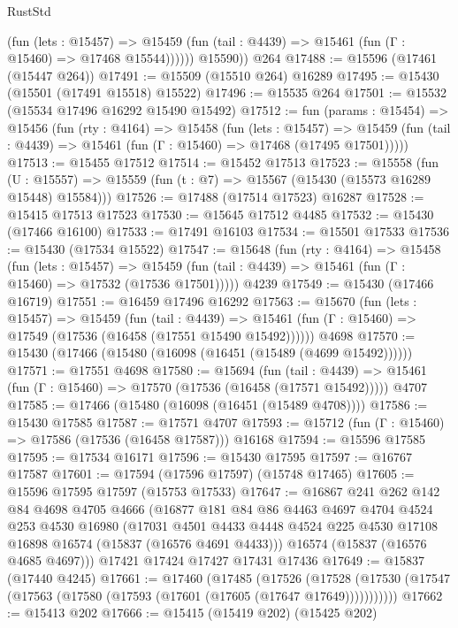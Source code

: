 \begin{lexlean}{RustStd}
\begin{coremodule}
{\begin{coremodule}
{{{{{{{{{{{{{{{{{{{{{{{{{{{{{{{{{{{{{{{{{{{{{{{{{{{{{{{{{{{{              (fun (lets : @15457) =>
              @15459 (fun (tail : @4439) => @15461 (fun (Γ : @15460) => @17468 @15544))))))
        @15590))
    @264
@17488 := @15596 (@17461 (@15447 @264))
@17491 := @15509 (@15510 @264) @16289
@17495 := @15430 (@15501 (@17491 @15518) @15522)
@17496 := @15535 @264
@17501 := @15532 (@15534 @17496 @16292 @15490 @15492)
@17512 := fun (params : @15454) =>
  @15456
    (fun (rty : @4164) =>
    @15458
      (fun (lets : @15457) =>
      @15459 (fun (tail : @4439) => @15461 (fun (Γ : @15460) => @17468 (@17495 @17501)))))
@17513 := @15455 @17512
@17514 := @15452 @17513
@17523 := @15558
    (fun (U : @15557) => @15559 (fun (t : @7) => @15567 (@15430 (@15573 @16289 @15448) @15584)))
@17526 := @17488 (@17514 @17523) @16287
@17528 := @15415 @17513 @17523
@17530 := @15645 @17512 @4485
@17532 := @15430 (@17466 @16100)
@17533 := @17491 @16103
@17534 := @15501 @17533
@17536 := @15430 (@17534 @15522)
@17547 := @15648
    (fun (rty : @4164) =>
    @15458
      (fun (lets : @15457) =>
      @15459 (fun (tail : @4439) => @15461 (fun (Γ : @15460) => @17532 (@17536 @17501)))))
    @4239
@17549 := @15430 (@17466 @16719)
@17551 := @16459 @17496 @16292
@17563 := @15670
    (fun (lets : @15457) =>
    @15459
      (fun (tail : @4439) =>
      @15461 (fun (Γ : @15460) => @17549 (@17536 (@16458 (@17551 @15490 @15492))))))
    @4698
@17570 := @15430 (@17466 (@15480 (@16098 (@16451 (@15489 (@4699 @15492))))))
@17571 := @17551 @4698
@17580 := @15694
    (fun (tail : @4439) => @15461 (fun (Γ : @15460) => @17570 (@17536 (@16458 (@17571 @15492)))))
    @4707
@17585 := @17466 (@15480 (@16098 (@16451 (@15489 @4708))))
@17586 := @15430 @17585
@17587 := @17571 @4707
@17593 := @15712 (fun (Γ : @15460) => @17586 (@17536 (@16458 @17587))) @16168
@17594 := @15596 @17585
@17595 := @17534 @16171
@17596 := @15430 @17595
@17597 := @16767 @17587
@17601 := @17594 (@17596 @17597) (@15748 @17465)
@17605 := @15596 @17595 @17597 (@15753 @17533)
@17647 := @16867
    @241
    @262
    @142
    @84
    @4698
    @4705
    @4666
    (@16877
      @181
      @84
      @86
      @4463
      @4697
      @4704
      @4524
      @253
      @4530
      @16980
      (@17031 @4501 @4433 @4448 @4524 @225 @4530 @17108 @16898 @16574 (@15837 (@16576 @4691 @4433)))
      @16574
      (@15837 (@16576 @4685 @4697)))
    @17421
    @17424
    @17427
    @17431
    @17436
@17649 := @15837 (@17440 @4245)
@17661 := @17460
    (@17485
      (@17526
        (@17528 (@17530 (@17547 (@17563 (@17580 (@17593 (@17601 (@17605 (@17647 @17649)))))))))))
@17662 := @15413 @202
@17666 := @15415 (@15419 @202) (@15425 @202)
}}}}}}}}}}}}}}}}}}}}}}}}}}}}}}}}}}}}}}}}}}}}}}}}}}}}}}}}}}}}
\end{coremodule}}
\end{coremodule}
\end{lexlean}
